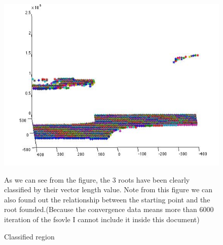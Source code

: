 \documentclass[11pt]{article}
\begin{document}
\begin{figure}
\centering
\includegraphics[scale=0.4]{p1.png}
\caption{Classified region}
\begin{minipage}{0.75\textwidth} %
{\footnotesize As we can see from the figure, the 3 roots have been clearly classified by their vector length value. Note from this figure we can also found out the relationship between the starting point and the root founded.(Because the convergence data means more than 6000 iteration of the fsovle I cannot include it inside this document)}
\end{minipage}
\label{fig:grid}
\end{figure}

\FloatBarrier
\end{document}
